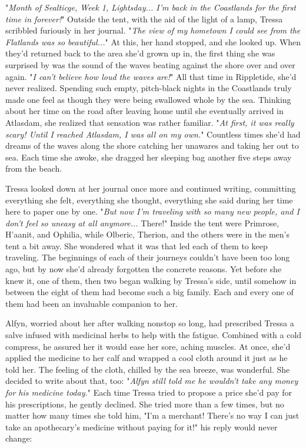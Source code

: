 "\emph{Month of Sealticge, Week 1, Lightsday... I'm back in the Coastlands for the first time in forever!}" Outside the tent, with the aid of the light of a lamp, Tressa scribbled furiously in her journal. "\emph{The view of my hometown I could see from the Flatlands was so beautiful...}" At this, her hand stopped, and she looked up. When they'd returned back to the area she'd grown up in, the first thing she was surprised by was the sound of the waves beating against the shore over and over again. "\emph{I can't believe how loud the waves are!}" All that time in Rippletide, she'd never realized. Spending such empty, pitch-black nights in the Coastlands truly made one feel as though they were being swallowed whole by the sea. Thinking about her time on the road after leaving home until she eventually arrived in Atlasdam, she realized that sensation was rather familiar. "\emph{At first, it was really scary! Until I reached Atlasdam, I was all on my own.}" Countless times she'd had dreams of the waves along the shore catching her unawares and taking her out to sea. Each time she awoke, she dragged her sleeping bag another five steps away from the beach. 

Tressa looked down at her journal once more and continued writing, committing everything she felt, everything she thought, everything she said during her time here to paper one by one. "\emph{But now I'm traveling with so many new people, and I don't feel so uneasy at all anymore...} There!" Inside the tent were Primrose, H'aanit, and Ophilia, while Olberic, Therion, and the others were in the men's tent a bit away. She wondered what it was that led each of them to keep traveling. The beginnings of each of their journeys couldn't have been too long ago, but by now she'd already forgotten the concrete reasons. Yet before she knew it, one of them, then two began walking by Tressa's side, until somehow in between the eight of them had become such a big family. Each and every one of them had been an invaluable companion to her.

Alfyn, worried about her after walking nonstop so long, had prescribed Tressa a salve infused with medicinal herbs to help with the fatigue. Combined with a cold compress, he assured her it would ease her sore, aching muscles. At once, she'd applied the medicine to her calf and wrapped a cool cloth around it just as he told her. The feeling of the cloth, chilled by the sea breeze, was wonderful. She decided to write about that, too: "\emph{Alfyn still told me he wouldn't take any money for his medicine today.}" Each time Tressa tried to propose a price she'd pay for his prescriptions, he gently declined. She tried more than a few times, but no matter how many times she told him, "I'm a merchant! There's no way I can just take an apothecary's medicine without paying for it!" his reply would never change: 

